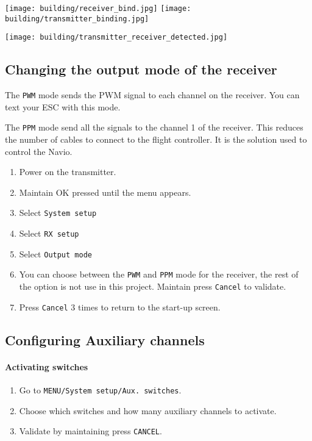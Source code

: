         
            \texttt{[image: building/receiver\_bind.jpg]}
            \texttt{[image: building/transmitter\_binding.jpg]}
            
            \texttt{[image: building/transmitter\_receiver\_detected.jpg]}
        
        \subsection{Changing the output mode of the receiver}
            The \texttt{PWM} mode sends the PWM signal to each channel on the receiver. You can text your ESC with this mode.
            
            The \texttt{PPM} mode send all the signals to the channel 1 of the receiver. This reduces the number of cables to connect to the flight controller. It is the solution used to control the Navio.
            
            \begin{enumerate}
                \item Power on the transmitter.
                \item Maintain OK pressed until the menu appears. 
                \item Select \texttt{System setup}
                \item Select \texttt{RX setup}
                \item Select \texttt{Output mode}
                \item You can choose between the \texttt{PWM} and \texttt{PPM} mode for the receiver, the rest of the option is not use in this project. Maintain press \texttt{Cancel} to validate.
                \item Press \texttt{Cancel} 3 times to return to the start-up screen.
            \end{enumerate}
            
        \subsection{Configuring Auxiliary channels}
            \paragraph{Activating switches}
                \begin{enumerate}
                    \item Go to \texttt{MENU/System setup/Aux. switches}.
                    \item Choose which switches and how many auxiliary channels to activate.
                    \item Validate by maintaining press \texttt{CANCEL}.
                \end{enumerate}
                
